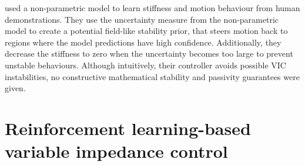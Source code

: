 \cite{franzeseILoSAInteractiveLearning2021} used a non-parametric model to learn stiffness and motion behaviour from human demonstrations. They use the uncertainty measure from the non-parametric model to create a potential field-like stability prior, that steers motion back to regions where the model predictions have high confidence. Additionally, they decrease the stiffness to zero when the uncertainty becomes too large to prevent unstable behaviours. Although intuitively, their controller avoids possible VIC instabilities, no constructive mathematical stability and passivity guarantees were given.

\section{Reinforcement learning-based variable impedance control}

